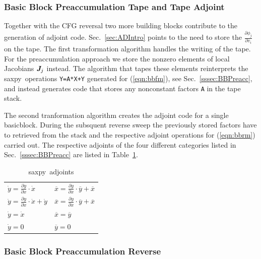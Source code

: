 \documentclass[11pt]{article}
\newcommand{\basicblock}{basicblock}
\newcommand{\saxpy}{saxpy}
\newcommand{\bmJ}{\mbox{\bf\em J}}
\newcommand{\code}[1]{{\small\tt{#1}}}
\newcommand{\refsec}[1]{{Sec.~\ref{#1}}}
\newcommand{\reftab}[1]{{Table~\ref{#1}}}
\newcommand{\refeqn}[1]{{(\ref{#1})}}
\begin{document}
\subsubsection{Basic Block Preaccumulation Tape and Tape Adjoint}\label{sssec:bbTA}

Together with the CFG reversal two more building blocks contribute to the 
generation of adjoint code. 
\refsec{sec:ADIntro} points to the need to store the $\frac{\partial \phi_j}{\partial v_i}$ on the tape. 
The first transformation algorithm handles the writing of the tape.
For the preaccumulation approach we store the nonzero elements of local
Jacobians $\bmJ_j$ instead. The algorithm that tapes these elements reinterprets
the \saxpy\ operations \code{Y=A*X+Y} generated for \refeqn{eqn:bbfm}, see \refsec{sssec:BBPreacc}, 
and instead generates code that stores any nonconstant factors \code{A} in the tape stack. 

The second tranformation algorithm creates the adjoint code for a single \basicblock.
During the subsquent reverse sweep the previously stored factors have to retrieved from the stack and 
the respective adjoint operations for \refeqn{eqn:bbrm} carried out. 
The respective adjoints of the four different categories listed in \refsec{sssec:BBPreacc} are listed in 
\reftab{tab:saxpyAdj}.
\begin{table}
\begin{tabular}{|l|l|}\hline
 $\dot{y} = \frac{\partial y }{\partial x }\cdot \dot{x}$ &  $\overline{x} = \frac{\partial y }{\partial x }\cdot \overline{y} + \overline{x}$ \\
 $\dot{y} = \frac{\partial y }{\partial x }\cdot \dot{x} + \dot{y}$ & $\overline{x} = \frac{\partial y }{\partial x }\cdot \overline{y} + \overline{x}$ \\
 $\dot{y} = \dot{x}$ 					& $\overline{x} = \overline{y}$ \\
 $\dot{y} = 0$ 						& $\overline{y} = 0$ 
\end{tabular}
\caption{\saxpy\ adjoints} \label{tab:saxpyAdj}
\end{table} 
      


\subsubsection{Basic Block Preaccumulation Reverse}\label{sssec:BBRev}
\end{document}

